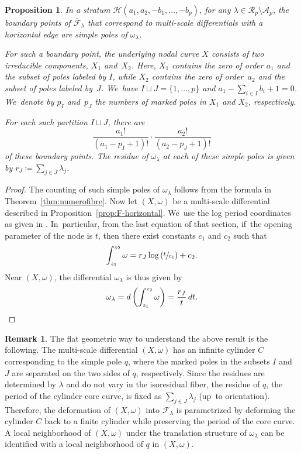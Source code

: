 \documentclass[JEP,XML,SOM,Unicode,NoFloatCountersInSection,published]{cedram}
\newtheorem{prop}[thm]{Proposition}
\theoremstyle{definition}
\newtheorem{rmk}[thm]{Remark}
\begin{document}
\begin{prop}\label{prop:simple-pole}
In a stratum $\mathcal{H}(a_{1},a_{2},-b_{1},\dots,-b_{p})$, for any $\lambda \in \mathcal{R}_{p} \setminus \mathcal{A}_{p}$, the boundary points of $\overline{\mathcal{F}}_{\lambda}$ that correspond to multi-scale differentials with a horizontal edge are simple poles of $\omega_{\lambda}$.

For such a boundary point, the underlying nodal curve $X$ consists of two irreducible components, $X_1$ and~$X_2$. Here, $X_1$ contains the zero of order $a_1$ and the subset of poles labeled by $I$, while $X_2$ contains the zero of order~$a_2$ and the subset of poles labeled by~$J$. We~have $I\sqcup J = \{1,\ldots,p\}$ and $a_1 - \sum_{i \in I} b_i + 1 = 0$. We~denote by $p_{I}$ and~$p_{J}$ the numbers of marked poles in $X_{1}$ and $X_{2}$, respectively.

For each such partition $I \sqcup J$, there are
\begin{equation}
\frac{a_{1}!}{(a_{1}-p_{I}+1)!} \cdot \frac{a_{2}!}{(a_{2}-p_{J}+1)!}
\end{equation}
of these boundary points. The residue of $\omega_{\lambda}$ at each of these simple poles is given by $r_{J}\coloneqq\sum_{j \in J} \lambda_{j}$.
\end{prop}

\begin{proof}
The counting of such simple poles of $\omega_\lambda$ follows from the formula in Theorem~\ref{thm:numerofibre}. Now let $(X,\omega)$ be a multi-scale differential described in Proposition~\ref{prop:F-horizontal}. We~use the log period coordinates as given in \cite[\S\S10.10 \&~13.3]{BCGGM2}. In~particular, from the last equation of that section, if~the opening parameter of the node is $t$, then there exist constants $c_{1}$ and $c_{2}$ such that
\[
\int_{z_{1}}^{z_{2}}\omega = r_{J}\log\left(\sfrac{t}{c_{1}}\right) + c_{2} .
\]
Near $(X,\omega)$, the differential $\omega_{\lambda}$ is thus given by
\[
\omega_{\lambda} = d\left(\int_{z_{1}}^{z_{2}}\omega\right)=\frac{r_{J}}{t}\,dt.\qedhere
\]
\end{proof}

\begin{rmk}
The flat geometric way to understand the above result is the following. The multi-scale differential $(X,\omega)$ has an infinite cylinder $C$ corresponding to the simple pole $q$, where the marked poles in the subsets $I$ and $J$ are separated on the two sides of $q$, respectively. Since the residues are determined by $\lambda$ and do not vary in the isoresidual fiber, the residue of $q$, \ie the period of the cylinder core curve, is fixed as $\sum_{j \in J} \lambda_{j}$ (up~to orientation). Therefore, the deformation of $(X,\omega)$ into $\mathcal F_\lambda$ is parametrized by deforming the cylinder $C$ back to a finite cylinder while preserving the period of the core curve. A local neighborhood of $(X,\omega)$ under the translation structure of $\omega_\lambda$ can be identified with a local neighborhood of $q$ in $(X,\omega)$.
\end{rmk}
\end{document}
